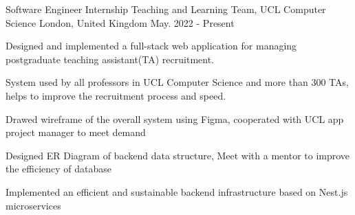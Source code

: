 

\begin{cventries}

  \cventry
    {Software Engineer Internship} %
    {Teaching and Learning Team, UCL Computer Science } %
    {London, United Kingdom} %
    {May. 2022 - Present} %
    {
      \begin{cvitems} %
        \item {Designed and implemented a full-stack web application for managing postgraduate teaching assistant(TA) recruitment.}
        \item {System used by all professors in UCL Computer Science and more than 300 TAs, helps to improve the recruitment process and speed.}
        \item {Drawed wireframe of the overall system using Figma, cooperated with UCL app project manager to meet demand}
        \item {Designed ER Diagram of backend data structure, Meet with a mentor to improve the efficiency of database}
        \item {Implemented an efficient and sustainable backend infrastructure based on Nest.js microservices}
      \end{cvitems}
    }


\end{cventries}
